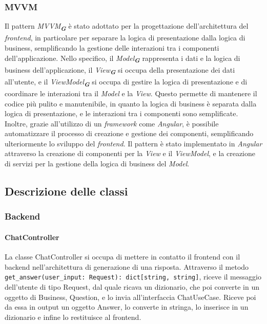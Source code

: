 \subsubsection{MVVM}
\label{sec:mvvm}

Il pattern \emph{MVVM}\textsubscript{\textbf{\textit{G}}} è stato adottato per la progettazione dell'architettura del \emph{frontend}, in particolare per separare la logica di presentazione dalla logica di business, semplificando la gestione delle interazioni tra i componenti dell'applicazione. Nello specifico, il \emph{Model}\textsubscript{\textbf{\textit{G}}} rappresenta i dati e la logica di business dell'applicazione, il \emph{View}\textsubscript{\textbf{\textit{G}}} si occupa della presentazione dei dati all'utente, e il \emph{ViewModel}\textsubscript{\textbf{\textit{G}}} si occupa di gestire la logica di presentazione e di coordinare le interazioni tra il \emph{Model} e la \emph{View}. Questo permette di mantenere il codice più pulito e manutenibile, in quanto la logica di business è separata dalla logica di presentazione, e le interazioni tra i componenti sono semplificate. Inoltre, grazie all'utilizzo di un \emph{framework} come \emph{Angular}, è possibile automatizzare il processo di creazione e gestione dei componenti, semplificando ulteriormente lo sviluppo del \emph{frontend}. Il pattern è stato implementato in \emph{Angular} attraverso la creazione di componenti per la \emph{View} e il \emph{ViewModel}, e la creazione di servizi per la gestione della logica di business del \emph{Model}.

\newpage



\subsection{Descrizione delle classi}
\label{sec:descrizione_classi}

\subsubsection{Backend}
\label{sec:backend}

\label{sec:controller}

\paragraph{ChatController}
\label{sec:chat_controller}
La classe ChatController si occupa di mettere in contatto il frontend con il backend nell'architettura di generazione di una risposta. Attraverso il metodo \texttt{get\_answer(user\_input: Request): dict[string, string]}, riceve il messaggio dell'utente di tipo Request, dal quale ricava un dizionario, che poi converte in un oggetto di Business, Question, e lo invia all'interfaccia ChatUseCase. Riceve poi da essa in output un oggetto Answer, lo converte in stringa, lo inserisce in un dizionario e infine lo restituisce al frontend.

